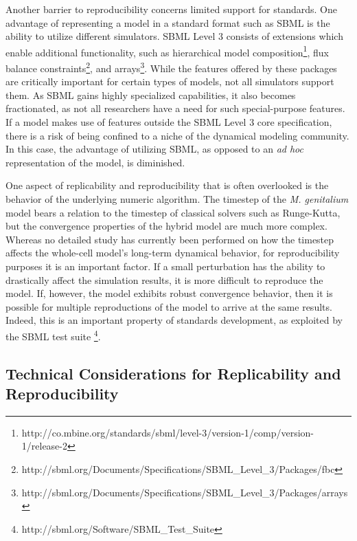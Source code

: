 \documentclass[journal,transmag,twoside]{IEEEtran}
\begin{document}
Another barrier to reproducibility concerns limited support for standards.
One advantage of representing a model in a standard format such as SBML is the ability
to utilize different simulators.
SBML Level 3 consists of extensions which enable additional
functionality, such as
hierarchical model composition\footnote{http://co.mbine.org/standards/sbml/level-3/version-1/comp/version-1/release-2},
flux balance constraints\footnote{ http://sbml.org/Documents/Specifications/SBML\_Level\_3/Packages/fbc}, and
arrays\footnote{http://sbml.org/Documents/Specifications/SBML\_Level\_3/Packages/arrays}.
While the features offered by these packages are critically important for certain
types of models, not all simulators support them.
As SBML gains highly specialized capabilities, it also becomes fractionated, as
not all researchers have a need for such special-purpose features.
If a model makes use of features outside the SBML Level 3 core specification,
there is a risk of being confined to a niche of the dynamical modeling community.
In this case, the advantage of utilizing SBML, as opposed to an \textit{ad hoc} representation
of the model, is diminished.

One aspect of replicability and reproducibility that is often overlooked is the
behavior of the underlying numeric algorithm.
The timestep of the \textit{M. genitalium} model bears a relation to the timestep
of classical solvers such as Runge-Kutta, but the convergence properties of the hybrid model
are much more complex.
Whereas no detailed study has currently been performed on how the timestep affects
the whole-cell model's long-term dynamical behavior, for reproducibility purposes it is
an important factor. If a small perturbation has the ability to drastically
affect the simulation results, it is more difficult to reproduce the model.
If, however, the model exhibits robust convergence behavior, then it is
possible for multiple reproductions of the model to arrive at the same results.
Indeed, this is an important property of standards development, as exploited by
the SBML test suite \footnote{http://sbml.org/Software/SBML\_Test\_Suite}.

\subsection{Technical Considerations for Replicability and Reproducibility}
\end{document}
